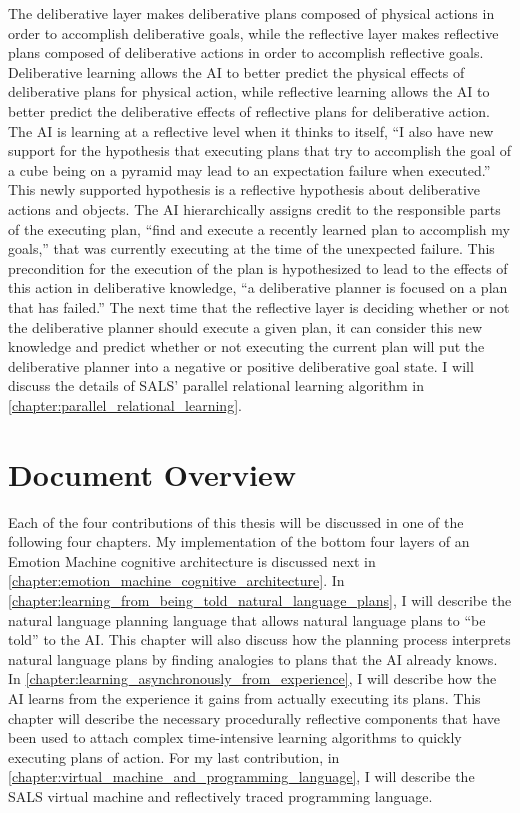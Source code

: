 The deliberative layer makes deliberative plans composed of physical
actions in order to accomplish deliberative goals, while the
reflective layer makes reflective plans composed of deliberative
actions in order to accomplish reflective goals.  Deliberative
learning allows the AI to better predict the physical effects of
deliberative plans for physical action, while reflective learning
allows the AI to better predict the deliberative effects of reflective
plans for deliberative action.  The AI is learning at a reflective
level when it thinks to itself, ``I also have new support for the
hypothesis that executing plans that try to accomplish the goal of a
cube being on a pyramid may lead to an expectation failure when
executed.''  This newly supported hypothesis is a reflective
hypothesis about deliberative actions and objects.  The AI
hierarchically assigns credit to the responsible parts of the
executing plan, ``find and execute a recently learned plan to
accomplish my goals,'' that was currently executing at the time of the
unexpected failure.  This precondition for the execution of the plan
is hypothesized to lead to the effects of this action in deliberative
knowledge, ``a deliberative planner is focused on a plan that has
failed.''  The next time that the reflective layer is deciding whether
or not the deliberative planner should execute a given plan, it can
consider this new knowledge and predict whether or not executing the
current plan will put the deliberative planner into a negative or
positive deliberative goal state.  I will discuss the details of SALS'
parallel relational learning algorithm in
{\mbox{\autoref{chapter:parallel_relational_learning}}}.

\section{Document Overview}

Each of the four contributions of this thesis will be discussed in one
of the following four chapters.  My implementation of the bottom four
layers of an Emotion Machine cognitive architecture is discussed next
in {\mbox{\autoref{chapter:emotion_machine_cognitive_architecture}}}.
In
{\mbox{\autoref{chapter:learning_from_being_told_natural_language_plans}}},
I will describe the natural language planning language that allows
natural language plans to ``be told'' to the AI.  This chapter will
also discuss how the planning process interprets natural language
plans by finding analogies to plans that the AI already knows.  In
{\mbox{\autoref{chapter:learning_asynchronously_from_experience}}}, I
will describe how the AI learns from the experience it gains from
actually executing its plans.  This chapter will describe the
necessary procedurally reflective components that have been used to
attach complex time-intensive learning algorithms to quickly executing
plans of action.  For my last contribution, in
{\mbox{\autoref{chapter:virtual_machine_and_programming_language}}}, I
will describe the SALS virtual machine and reflectively traced
programming language.


